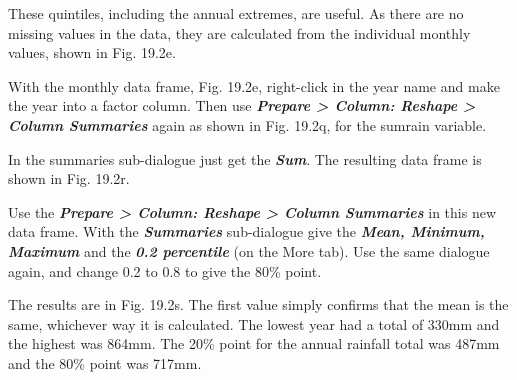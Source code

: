 \documentclass[
  letterpaper,
  DIV=11,
  numbers=noendperiod]{scrreprt}
\begin{document}
These quintiles, including the annual extremes, are useful. As there are
no missing values in the data, they are calculated from the individual
monthly values, shown in Fig. 19.2e.

With the monthly data frame, Fig. 19.2e, right-click in the year name
and make the year into a factor column. Then use \textbf{\emph{Prepare
\textgreater{} Column: Reshape \textgreater{} Column Summaries}} again
as shown in Fig. 19.2q, for the sumrain variable.

In the summaries sub-dialogue just get the \textbf{\emph{Sum}}. The
resulting data frame is shown in Fig. 19.2r.

Use the \textbf{\emph{Prepare \textgreater{} Column: Reshape
\textgreater{} Column Summaries}} in this new data frame. With the
\textbf{\emph{Summaries}} sub-dialogue give the \textbf{\emph{Mean,
Minimum,}} \textbf{\emph{Maximum}} and the \textbf{\emph{0.2
percentile}} (on the More tab). Use the same dialogue again, and change
0.2 to 0.8 to give the 80\% point.

The results are in Fig. 19.2s. The first value simply confirms that the
mean is the same, whichever way it is calculated. The lowest year had a
total of 330mm and the highest was 864mm. The 20\% point for the annual
rainfall total was 487mm and the 80\% point was 717mm.
\end{document}
